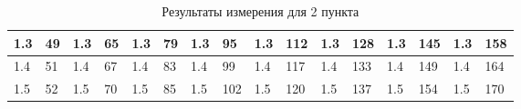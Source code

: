 \documentclass[12pt, a4paper]{article}
\begin{document}
\begin{table}[H]
\begin{tabular}{|ll|ll|ll|ll|ll|ll|ll|ll|}
    \multicolumn{1}{|l|}{1.3}  & 49                         & \multicolumn{1}{l|}{1.3}  & 65                         & \multicolumn{1}{l|}{1.3}  & 79                         & \multicolumn{1}{l|}{1.3}  & 95                         & \multicolumn{1}{l|}{1.3}  & 112                        & \multicolumn{1}{l|}{1.3}  & 128                        & \multicolumn{1}{l|}{1.3}  & 145                        & \multicolumn{1}{l|}{1.3}  & 158                        \\ \hline
    \multicolumn{1}{|l|}{1.4}  & 51                         & \multicolumn{1}{l|}{1.4}  & 67                         & \multicolumn{1}{l|}{1.4}  & 83                         & \multicolumn{1}{l|}{1.4}  & 99                         & \multicolumn{1}{l|}{1.4}  & 117                        & \multicolumn{1}{l|}{1.4}  & 133                        & \multicolumn{1}{l|}{1.4}  & 149                        & \multicolumn{1}{l|}{1.4}  & 164                        \\ \hline
    \multicolumn{1}{|l|}{1.5}  & 52                         & \multicolumn{1}{l|}{1.5}  & 70                         & \multicolumn{1}{l|}{1.5}  & 85                         & \multicolumn{1}{l|}{1.5}  & 102                        & \multicolumn{1}{l|}{1.5}  & 120                        & \multicolumn{1}{l|}{1.5}  & 137                        & \multicolumn{1}{l|}{1.5}  & 154                        & \multicolumn{1}{l|}{1.5}  & 170                        \\ \hline
  \end{tabular}
  \caption{Результаты измерения для 2 пункта}
  \label{table:hall}
\end{table}
\end{document}
